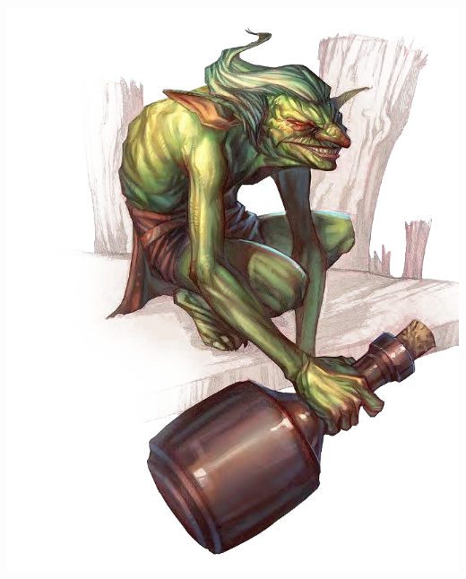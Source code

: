 \documentclass[11pt]{article}
\begin{document}
\begin{minipage}{0.5\textwidth}
\includegraphics{img/gremlin.png}
\end{minipage}%
\end{document}
